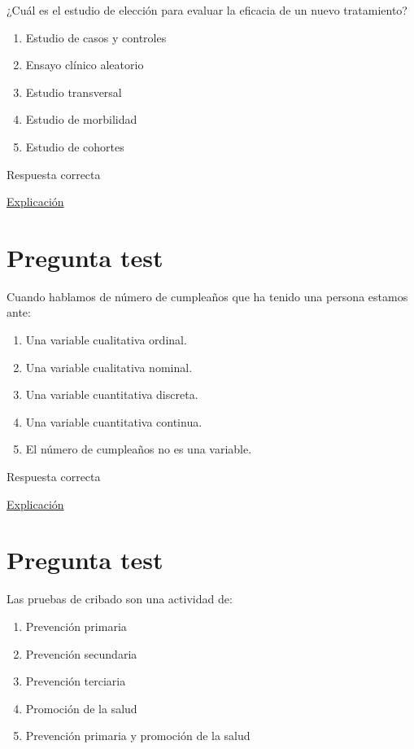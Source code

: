 \documentclass[
]{book}
\providecommand{\tightlist}{%
  \setlength{\itemsep}{0pt}\setlength{\parskip}{0pt}}
\begin{document}
¿Cuál es el estudio de elección para evaluar la eficacia de un nuevo tratamiento?

\begin{enumerate}
\def\labelenumi{\alph{enumi})}
\tightlist
\item
  Estudio de casos y controles
\item
  Ensayo clínico aleatorio
\item
  Estudio transversal
\item
  Estudio de morbilidad
\item
  Estudio de cohortes
\end{enumerate}

Respuesta correcta

\href{https://www.cancer.gov/espanol/publicaciones/diccionarios/diccionario-cancer/def/ensayo-clinico-aleatorizado}{Explicación}

\hypertarget{pregunta-test-26}{%
\section{Pregunta test}\label{pregunta-test-26}}

Cuando hablamos de número de cumpleaños que ha tenido una persona estamos ante:

\begin{enumerate}
\def\labelenumi{\alph{enumi})}
\tightlist
\item
  Una variable cualitativa ordinal.
\item
  Una variable cualitativa nominal.
\item
  Una variable cuantitativa discreta.
\item
  Una variable cuantitativa continua.
\item
  El número de cumpleaños no es una variable.
\end{enumerate}

Respuesta correcta

\href{https://1fjmanzano.github.io/bioestadistica/tipos-de-variables.html}{Explicación}

\hypertarget{pregunta-test-27}{%
\section{Pregunta test}\label{pregunta-test-27}}

Las pruebas de cribado son una actividad de:

\begin{enumerate}
\def\labelenumi{\alph{enumi})}
\tightlist
\item
  Prevención primaria
\item
  Prevención secundaria
\item
  Prevención terciaria
\item
  Promoción de la salud
\item
  Prevención primaria y promoción de la salud
\end{enumerate}
\end{document}
